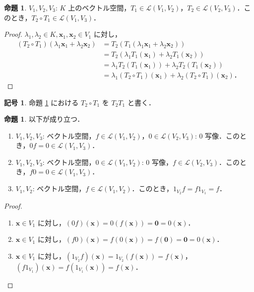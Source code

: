 \documentclass{jlreq}
\theoremstyle{definition}
\newtheorem{sym}[thm]{記号}
\newtheorem{prop}[thm]{命題}
\begin{document}
      \begin{prop}\label{composition-of-linear-map-is-linear-map}
        $V_1,V_2,V_3$: $K$ 上のベクトル空間，$T_1 \in \mathcal{L}(V_1,V_2)$，$T_2 \in \mathcal{L}(V_2,V_3)$．このとき，$T_2 \circ T_1 \in \mathcal{L}(V_1,V_3)$．
      \end{prop}
      \begin{proof}
        $\lambda_1,\lambda_2 \in K, \bm{x}_1,\bm{x}_2 \in V_1$ に対し，
        \begin{align*}
          (T_2 \circ T_1)(\lambda_1\bm{x}_1+\lambda_2\bm{x}_2) &= T_2(T_1(\lambda_1\bm{x}_1+\lambda_2\bm{x}_2)) \\
          &= T_2(\lambda_1T_1(\bm{x}_1)+\lambda_2T_1(\bm{x}_2)) \\
          &= \lambda_1T_2(T_1(\bm{x}_1))+\lambda_2T_2(T_1(\bm{x}_2)) \\
          &= \lambda_1(T_2 \circ T_1)(\bm{x}_1)+\lambda_2(T_2 \circ T_1)(\bm{x}_2)．
        \end{align*}
      \end{proof}
      \begin{sym}
        命題 \ref{composition-of-linear-map-is-linear-map} における $T_2 \circ T_1$ を $T_2T_1$ と書く． 
      \end{sym}
      \begin{prop}
        以下が成り立つ．
        \begin{enumerate}
          \item $V_1,V_2,V_3$: ベクトル空間，$f \in \mathcal{L}(V_1,V_2)$，$0 \in \mathcal{L}(V_2,V_3)$: $0$ 写像．このとき，$0f=0 \in \mathcal{L}(V_1,V_3)$．
          \item $V_1,V_2,V_3$: ベクトル空間，$0 \in \mathcal{L}(V_1,V_2)$: $0$ 写像，$f \in \mathcal{L}(V_2,V_3)$．このとき，$f0=0 \in \mathcal{L}(V_1,V_3)$．
          \item $V_1,V_2$: ベクトル空間，$f \in \mathcal{L}(V_1,V_2)$．このとき，$1_{V_2}f=f1_{V_1}=f$．
        \end{enumerate}
      \end{prop}
      \begin{proof}
        \mbox{}
        \begin{enumerate}
          \item $\bm{x} \in V_1$ に対し，$(0f)(\bm{x})=0(f(\bm{x}))=\bm{0}=0(\bm{x})$．
          \item $\bm{x} \in V_1$ に対し，$(f0)(\bm{x})=f(0(\bm{x}))=f(\bm{0})=\bm{0}=0(\bm{x})$．
          \item $\bm{x} \in V_1$ に対し，$(1_{V_2}f)(\bm{x})=1_{V_2}(f(\bm{x}))=f(\bm{x})$，$(f1_{V_1})(\bm{x})=f(1_{V_1}(\bm{x}))=f(\bm{x})$．
        \end{enumerate}
      \end{proof}
\end{document}
